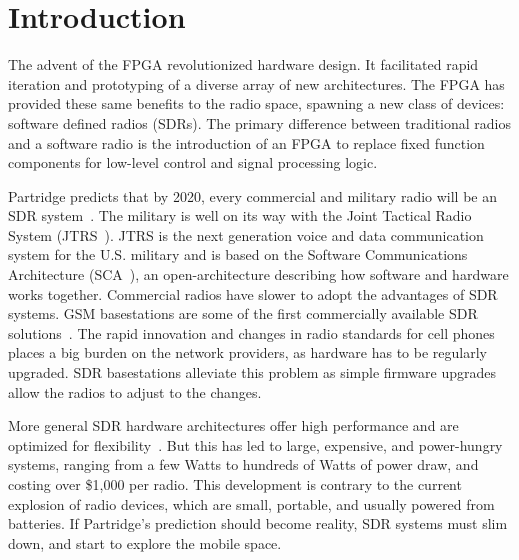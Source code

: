 \section{Introduction}
\label{sec:intro}

The advent of the FPGA revolutionized hardware design. It facilitated
rapid iteration and prototyping of a diverse array of new
architectures. The FPGA has provided these same benefits to the radio
space, spawning a new class of devices: software defined radios
(SDRs). The primary difference between traditional radios and a
software radio is the introduction of an FPGA to replace fixed
function components for low-level control and signal processing
logic. %

Partridge predicts that by 2020, every commercial and military radio
will be an SDR system~\cite{patridge:SDR}. The military is well on its
way with the Joint Tactical Radio System
(JTRS~\cite{mitola2000sdr}). JTRS is the next generation voice
and data communication system for the U.S. military and is based on
the Software Communications Architecture (SCA~\cite{SCA}), an
open-architecture describing how software and hardware works
together. Commercial radios have slower to adopt the advantages of SDR
systems. GSM basestations are some of the first commercially available
SDR solutions~\cite{vocallo}. The rapid innovation and changes in
radio standards for cell phones places a big burden on the network
providers, as hardware has to be regularly upgraded. SDR basestations
alleviate this problem as simple firmware upgrades allow the radios to
adjust to the changes.

More general SDR hardware architectures offer high performance and are
optimized for
flexibility~\cite{soda,kuar,warp-platform,usrp:e100,usrp:n200,sora}. But
this has led to large, expensive, and power-hungry systems, ranging
from a few Watts to hundreds of Watts of power draw, and costing over
\$1,000 per radio. This development is contrary to the current
explosion of radio devices, which are small, portable, and usually
powered from batteries. If Partridge's prediction should become
reality, SDR systems must slim down, and start to explore the mobile
space.

